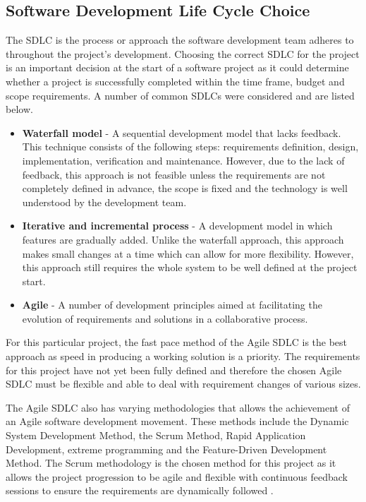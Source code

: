 \documentclass[12pt,onecolumn]{article}
\begin{document}
	\subsection{Software Development Life Cycle Choice}
	The SDLC is the process or approach the software development team adheres to throughout the project's development. Choosing the correct SDLC for the project is an important decision at the start of a software project as it could determine whether a project is successfully completed within the time frame, budget and scope requirements. A number of common SDLCs were considered and are listed below.
	
	\begin{itemize}
		\item \textbf{Waterfall model} - A sequential development model that lacks feedback. This technique consists of the following steps: requirements definition, design, implementation, verification and maintenance. However, due to the lack of feedback, this approach is not feasible unless the requirements are not completely defined in advance, the scope is fixed and the technology is well understood by the development team.
		
		\item \textbf{Iterative and incremental process} - A development model in which features are gradually added. Unlike the waterfall approach, this approach makes small changes at a time which can allow for more flexibility. However, this approach still requires the whole system to be well defined at the project start.
		
		\item \textbf{Agile} - A number of development principles aimed at facilitating the evolution of requirements and solutions in a collaborative process.
		
	\end{itemize}
	
	For this particular project, the fast pace method of the Agile SDLC is the best approach as speed in producing a working solution is a priority. The requirements for this project have not yet been fully defined and therefore the chosen Agile SDLC must be flexible and able to deal with requirement changes of various sizes.
	
	The Agile SDLC also has varying methodologies that allows the achievement of an Agile software development movement. These methods include the Dynamic System Development Method, the Scrum Method, Rapid Application Development, extreme programming and the Feature-Driven Development Method. The Scrum methodology is the chosen method for this project as it allows the project progression to be agile and flexible with continuous feedback sessions to ensure the requirements are dynamically followed \cite{Kinsey}.
	
\end{document}
